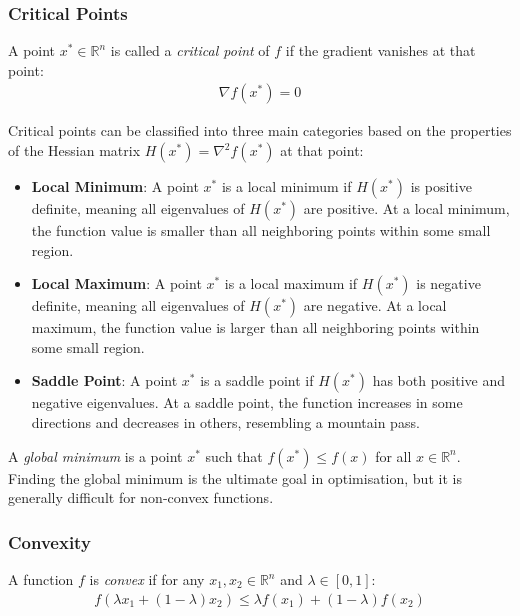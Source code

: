 \subsubsection{Critical Points}

A point $x^* \in \mathbb{R}^n$ is called a \textit{critical point} of $f$ if the gradient vanishes at that point:
\begin{align}
    \nabla f(x^*) = 0
\end{align}

Critical points can be classified into three main categories based on the properties of the Hessian matrix $H(x^*) = \nabla^2 f(x^*)$ at that point:

\begin{itemize}
    \item \textbf{Local Minimum}: A point $x^*$ is a local minimum if $H(x^*)$ is positive definite, meaning all eigenvalues of $H(x^*)$ are positive. At a local minimum, the function value is smaller than all neighboring points within some small region.
    
    \item \textbf{Local Maximum}: A point $x^*$ is a local maximum if $H(x^*)$ is negative definite, meaning all eigenvalues of $H(x^*)$ are negative. At a local maximum, the function value is larger than all neighboring points within some small region.
    
    \item \textbf{Saddle Point}: A point $x^*$ is a saddle point if $H(x^*)$ has both positive and negative eigenvalues. At a saddle point, the function increases in some directions and decreases in others, resembling a mountain pass.
\end{itemize}

A \textit{global minimum} is a point $x^*$ such that $f(x^*) \leq f(x)$ for all $x \in \mathbb{R}^n$. Finding the global minimum is the ultimate goal in optimisation, but it is generally difficult for non-convex functions.

\subsubsection{Convexity}

A function $f$ is \textit{convex} if for any $x_1, x_2 \in \mathbb{R}^n$ and $\lambda \in [0, 1]$:
\begin{align}
    f(\lambda x_1 + (1-\lambda)x_2) \leq \lambda f(x_1) + (1-\lambda)f(x_2)
\end{align}

